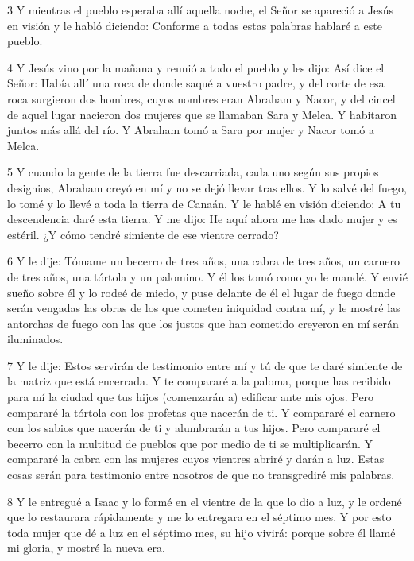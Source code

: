 \par 3 Y mientras el pueblo esperaba allí aquella noche, el Señor se apareció a Jesús en visión y le habló diciendo: Conforme a todas estas palabras hablaré a este pueblo.

\par 4 Y Jesús vino por la mañana y reunió a todo el pueblo y les dijo: Así dice el Señor: Había allí una roca de donde saqué a vuestro padre, y del corte de esa roca surgieron dos hombres, cuyos nombres eran Abraham y Nacor, y del cincel de aquel lugar nacieron dos mujeres que se llamaban Sara y Melca. Y habitaron juntos más allá del río. Y Abraham tomó a Sara por mujer y Nacor tomó a Melca.

\par 5 Y cuando la gente de la tierra fue descarriada, cada uno según sus propios designios, Abraham creyó en mí y no se dejó llevar tras ellos. Y lo salvé del fuego, lo tomé y lo llevé a toda la tierra de Canaán. Y le hablé en visión diciendo: A tu descendencia daré esta tierra. Y me dijo: He aquí ahora me has dado mujer y es estéril. ¿Y cómo tendré simiente de ese vientre cerrado?

\par 6 Y le dije: Tómame un becerro de tres años, una cabra de tres años, un carnero de tres años, una tórtola y un palomino. Y él los tomó como yo le mandé. Y envié sueño sobre él y lo rodeé de miedo, y puse delante de él el lugar de fuego donde serán vengadas las obras de los que cometen iniquidad contra mí, y le mostré las antorchas de fuego con las que los justos que han cometido creyeron en mí serán iluminados.

\par 7 Y le dije: Estos servirán de testimonio entre mí y tú de que te daré simiente de la matriz que está encerrada. Y te compararé a la paloma, porque has recibido para mí la ciudad que tus hijos (comenzarán a) edificar ante mis ojos. Pero compararé la tórtola con los profetas que nacerán de ti. Y compararé el carnero con los sabios que nacerán de ti y alumbrarán a tus hijos. Pero compararé el becerro con la multitud de pueblos que por medio de ti se multiplicarán. Y compararé la cabra con las mujeres cuyos vientres abriré y darán a luz. Estas cosas serán para testimonio entre nosotros de que no transgrediré mis palabras.

\par 8 Y le entregué a Isaac y lo formé en el vientre de la que lo dio a luz, y le ordené que lo restaurara rápidamente y me lo entregara en el séptimo mes. Y por esto toda mujer que dé a luz en el séptimo mes, su hijo vivirá: porque sobre él llamé mi gloria, y mostré la nueva era.

